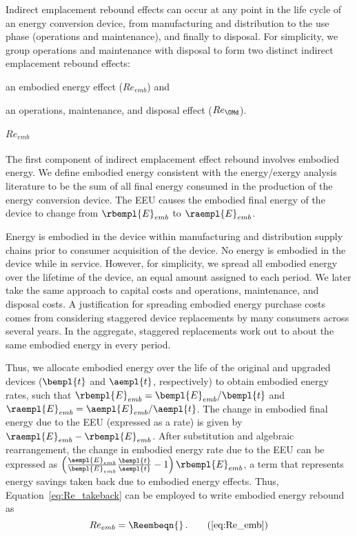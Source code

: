 Indirect emplacement rebound effects 
can occur at any point in the life cycle of an energy conversion device,
from manufacturing and distribution 
to the use phase (operations and maintenance),
and finally to disposal.
For simplicity, we group operations and maintenance with disposal to form
two distinct indirect emplacement rebound effects:
%
\begin{enumerate*}[label={(\alph*)}]
	
  \item an embodied energy effect ($Re_{emb}$) and 
  
  \item an operations, maintenance, and disposal effect ($Re_{\OMd}$).
    
\end{enumerate*}


\paragraph{$Re_{emb}$}
\label{sec:Re_emb}

The first component of indirect emplacement effect rebound
involves embodied energy.
We define embodied energy consistent with the energy/exergy analysis literature
to be the sum of all final energy consumed
in the production of the energy conversion device.
The EEU
causes the embodied final energy of the device to change
from $\rbempl{E}_{emb}$ to $\raempl{E}_{emb}$.

Energy is embodied in the device within manufacturing and distribution supply chains
prior to consumer acquisition of the device.
No energy is embodied in the device while in service.
However, for simplicity, we spread all embodied energy
over the lifetime of the device,
an equal amount assigned to each period.
We later take the same approach to capital costs and
operations, maintenance, and disposal costs.
A justification for spreading embodied energy purchase costs comes from considering
staggered device replacements by many consumers across several years.
In the aggregate, staggered replacements
work out to about the same embodied energy in every period.

Thus, we allocate embodied energy over the life of the original and upgraded devices
($\bempl{t}$ and $\aempl{t}$, respectively)
to obtain embodied energy rates, such that
$\rbempl{E}_{emb} = \bempl{E}_{emb} / \bempl{t}$
and 
$\raempl{E}_{emb} = \aempl{E}_{emb} / \aempl{t}$.
The change in embodied final energy due to the EEU (expressed as a rate) is given by
$\raempl{E}_{emb} - \rbempl{E}_{emb}$.
After substitution and algebraic rearrangement,
the change in embodied energy rate due to the EEU can be expressed as
$\left( \frac{\aempl{E}_{emb}}{\bempl{E}_{emb}}
  \frac{\bempl{t}}{\aempl{t}} - 1 \right) \rbempl{E}_{emb}$, 
a term that represents energy savings taken back due to embodied energy effects.
Thus, Equation~\ref{eq:Re_takeback} can be employed to write embodied energy rebound as
%
\begin{equation} 
  Re_{emb} = \Reembeqn{} \, . \tag{\ref{eq:Re_emb}}
\end{equation}

